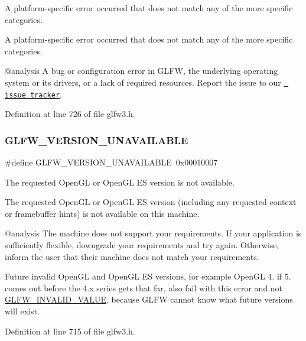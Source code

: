 A platform-\/specific error occurred that does not match any of the more specific categories. 

A platform-\/specific error occurred that does not match any of the more specific categories.

@analysis A bug or configuration error in G\+L\+FW, the underlying operating system or its drivers, or a lack of required resources. Report the issue to our \href{https://github.com/glfw/glfw/issues}{\texttt{ issue tracker}}. 

Definition at line 726 of file glfw3.\+h.

\mbox{\label{group__errors_gad16c5565b4a69f9c2a9ac2c0dbc89462}} 
\subsubsection{\texorpdfstring{GLFW\_VERSION\_UNAVAILABLE}{GLFW\_VERSION\_UNAVAILABLE}}
{\footnotesize\ttfamily \#define G\+L\+F\+W\+\_\+\+V\+E\+R\+S\+I\+O\+N\+\_\+\+U\+N\+A\+V\+A\+I\+L\+A\+B\+LE~0x00010007}



The requested Open\+GL or Open\+GL ES version is not available. 

The requested Open\+GL or Open\+GL ES version (including any requested context or framebuffer hints) is not available on this machine.

@analysis The machine does not support your requirements. If your application is sufficiently flexible, downgrade your requirements and try again. Otherwise, inform the user that their machine does not match your requirements.

\begin{DoxyParagraph}{}
Future invalid Open\+GL and Open\+GL ES versions, for example Open\+GL 4. if 5. comes out before the 4.\+x series gets that far, also fail with this error and not \mbox{\hyperlink{group__errors_gaaf2ef9aa8202c2b82ac2d921e554c687}{G\+L\+F\+W\+\_\+\+I\+N\+V\+A\+L\+I\+D\+\_\+\+V\+A\+L\+UE}}, because G\+L\+FW cannot know what future versions will exist. 
\end{DoxyParagraph}


Definition at line 715 of file glfw3.\+h.

